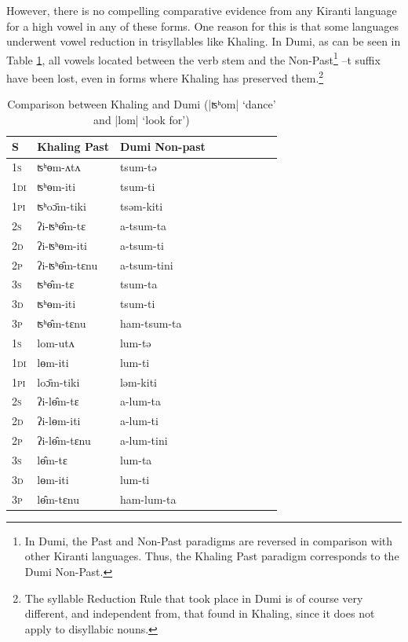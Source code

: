 \documentclass[oldfontcommands,oneside,a4paper,11pt]{article}
\newcommand{\ipa}[1]{{\phon \mbox{#1}}} %
\begin{document}
However, there is no compelling comparative evidence from any Kiranti language for a high vowel in any of these forms. One reason for this is that some languages underwent vowel reduction in trisyllables like Khaling. In Dumi, as can be seen in Table \ref{tab:intrans.dumi}, all vowels located between the verb stem and the Non-Past\footnote{In Dumi, the Past and Non-Past paradigms are reversed in comparison with other Kiranti languages. Thus, the Khaling Past paradigm corresponds to the Dumi Non-Past.} \ipa{--t} suffix  have been lost, even in forms where Khaling has preserved them.\footnote{The syllable Reduction Rule that took place in Dumi is of course very different, and independent from, that found in Khaling, since it does not apply to disyllabic nouns.}

 
\begin{table}[h]
\caption{Comparison between Khaling and Dumi (|\ipa{ʦʰom}|	`dance' and |\ipa{lom}| `look for')} \label{tab:intrans.dumi} \centering
\begin{tabular}{lllllllll}
\toprule
S & Khaling Past & Dumi Non-past&  \\
\midrule
\textsc{1s} &   \ipa{ʦʰɵm-ʌtʌ} &  \ipa{tsum-tə} \\
\textsc{1di} &    \ipa{ʦʰɵm-iti}& \ipa{tsum-ti} \\
\textsc{1pi} &    \ipa{ʦʰoɔ̄m-tiki} &\ipa{tsəm-kiti}\\
\textsc{2s}   &\ipa{ʔi-ʦʰɵ̂m-tɛ}  & \ipa{a-tsum-ta} \\
\textsc{2d}   &\ipa{ʔi-ʦʰɵm-iti} &  \ipa{a-tsum-ti}\\
\textsc{2p}  & \ipa{ʔi-ʦʰɵ̂m-tɛnu} &  \ipa{a-tsum-tini} \\
\textsc{3s}  &\ipa{ʦʰɵ̂m-tɛ} & \ipa{tsum-ta}\\
\textsc{3d}   &\ipa{ʦʰɵm-iti} &\ipa{tsum-ti}\\
\textsc{3p}  & \ipa{ʦʰɵ̂m-tɛnu} &\ipa{ham-tsum-ta} \\
\midrule
\textsc{1s} &   \ipa{lom-utʌ} &  \ipa{lum-tə} &\\
\textsc{1di} &    \ipa{lɵm-iti}& \ipa{lum-ti}& \\
\textsc{1pi} &    \ipa{loɔ̄m-tiki} &\ipa{ləm-kiti}&\\
\textsc{2s}   &\ipa{ʔi-lɵ̂m-tɛ}  & \ipa{a-lum-ta}& \\
\textsc{2d}   &\ipa{ʔi-lɵm-iti} &  \ipa{a-lum-ti}&\\
\textsc{2p}  & \ipa{ʔi-lɵ̂m-tɛnu} &  \ipa{a-lum-tini} &\\
\textsc{3s}  &\ipa{lɵ̂m-tɛ} & \ipa{lum-ta}&\\
\textsc{3d}   &\ipa{lɵm-iti} &\ipa{lum-ti}&\\
\textsc{3p}  & \ipa{lɵ̂m-tɛnu} &\ipa{ham-lum-ta}& \\
\bottomrule
\end{tabular}
\end{table}
\end{document}
